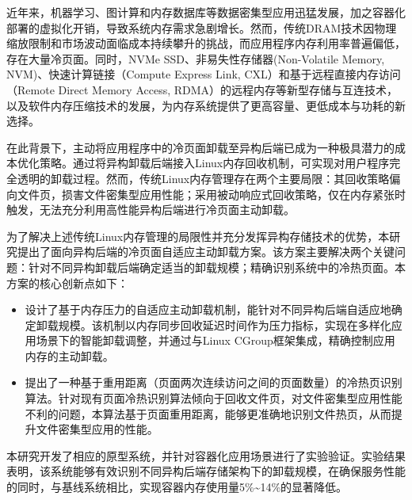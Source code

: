 
\begin{chineseabstract}

近年来，机器学习、图计算和内存数据库等数据密集型应用迅猛发展，加之容器化部署的虚拟化开销，导致系统内存需求急剧增长。然而，传统DRAM技术因物理缩放限制和市场波动面临成本持续攀升的挑战，而应用程序内存利用率普遍偏低，存在大量冷页面。同时，NVMe SSD、非易失性存储器(Non-Volatile Memory, NVM)、快速计算链接（Compute Express Link, CXL）和基于远程直接内存访问（Remote Direct Memory Access, RDMA）的远程内存等新型存储与互连技术，以及软件内存压缩技术的发展，为内存系统提供了更高容量、更低成本与功耗的新选择。

在此背景下，主动将应用程序中的冷页面卸载至异构后端已成为一种极具潜力的成本优化策略。通过将异构卸载后端接入Linux内存回收机制，可实现对用户程序完全透明的卸载过程。然而，传统Linux内存管理存在两个主要局限：其回收策略偏向文件页，损害文件密集型应用性能；采用被动响应式回收策略，仅在内存紧张时触发，无法充分利用高性能异构后端进行冷页面主动卸载。

为了解决上述传统Linux内存管理的局限性并充分发挥异构存储技术的优势，本研究提出了面向异构后端的冷页面自适应主动卸载方案。该方案主要解决两个关键问题：针对不同异构卸载后端确定适当的卸载规模；精确识别系统中的冷热页面。本方案的核心创新点如下：
\begin{itemize}
    \item 设计了基于内存压力的自适应主动卸载机制，能针对不同异构后端自适应地确定卸载规模。该机制以内存同步回收延迟时间作为压力指标，实现在多样化应用场景下的智能卸载调整，并通过与Linux CGroup框架集成，精确控制应用内存的主动卸载。
    \item 提出了一种基于重用距离（页面两次连续访问之间的页面数量）的冷热页识别算法。针对现有页面冷热识别算法倾向于回收文件页，对文件密集型应用性能不利的问题，本算法基于页面重用距离，能够更准确地识别文件热页，从而提升文件密集型应用的性能。
\end{itemize}

本研究开发了相应的原型系统，并针对容器化应用场景进行了实验验证。实验结果表明，该系统能够有效识别不同异构后端存储架构下的卸载规模，在确保服务性能的同时，与基线系统相比，实现容器内存使用量5\%\~{}14\%的显著降低。

\end{chineseabstract}